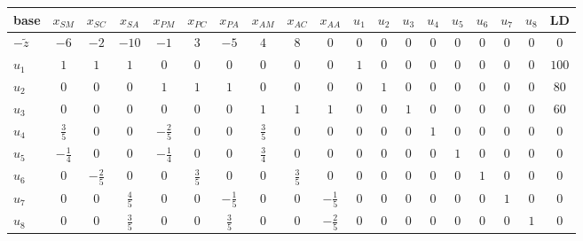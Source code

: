 \documentclass[12pt]{article}
\begin{document}
\begin{table}[htpb]
\centering
\footnotesize %
\setlength{\tabcolsep}{3.5pt} %
\begin{tabular}{lccccccccc|cccccccc|c}
\toprule
base & $x_{SM}$ & $x_{SC}$ & $x_{SA}$ & $x_{PM}$ & $x_{PC}$ & $x_{PA}$ & $x_{AM}$ & $x_{AC}$ & $x_{AA}$ & $u_1$ & $u_2$ & $u_3$ & $u_4$ & $u_5$ & $u_6$ & $u_7$ & $u_8$ & LD \\
\midrule
$-\widetilde{z}$ & $-6$ & $-2$ & $-10$ & $-1$ & $3$ & $-5$ & $4$ & $8$ & $0$ & $0$ & $0$ & $0$ & $0$ & $0$ & $0$ & $0$ & $0$ & $0$ \\
\midrule
$u_1$ & $1$ & $1$ & $1$ & $0$ & $0$ & $0$ & $0$ & $0$ & $0$ & $1$ & $0$ & $0$ & $0$ & $0$ & $0$ & $0$ & $0$ & $100$ \\
$u_2$ & $0$ & $0$ & $0$ & $1$ & $1$ & $1$ & $0$ & $0$ & $0$ & $0$ & $1$ & $0$ & $0$ & $0$ & $0$ & $0$ & $0$ & $80$ \\
$u_3$ & $0$ & $0$ & $0$ & $0$ & $0$ & $0$ & $1$ & $1$ & $1$ & $0$ & $0$ & $1$ & $0$ & $0$ & $0$ & $0$ & $0$ & $60$ \\
$u_4$ & $\frac{3}{5}$ & $0$ & $0$ & $-\frac{2}{5}$ & $0$ & $0$ & $\frac{3}{5}$ & $0$ & $0$ & $0$ & $0$ & $0$ & $1$ & $0$ & $0$ & $0$ & $0$ & $0$ \\
$u_5$ & $-\frac{1}{4}$ & $0$ & $0$ & $-\frac{1}{4}$ & $0$ & $0$ & $\frac{3}{4}$ & $0$ & $0$ & $0$ & $0$ & $0$ & $0$ & $1$ & $0$ & $0$ & $0$ & $0$ \\
$u_6$ & $0$ & $-\frac{2}{5}$ & $0$ & $0$ & $\frac{3}{5}$ & $0$ & $0$ & $\frac{3}{5}$ & $0$ & $0$ & $0$ & $0$ & $0$ & $0$ & $1$ & $0$ & $0$ & $0$ \\
$u_7$ & $0$ & $0$ & $\frac{4}{5}$ & $0$ & $0$ & $-\frac{1}{5}$ & $0$ & $0$ & $-\frac{1}{5}$ & $0$ & $0$ & $0$ & $0$ & $0$ & $0$ & $1$ & $0$ & $0$ \\
$u_8$ & $0$ & $0$ & $\frac{3}{5}$ & $0$ & $0$ & $\frac{3}{5}$ & $0$ & $0$ & $-\frac{2}{5}$ & $0$ & $0$ & $0$ & $0$ & $0$ & $0$ & $0$ & $1$ & $0$ \\
\bottomrule
\end{tabular}
\end{table}
\end{document}
